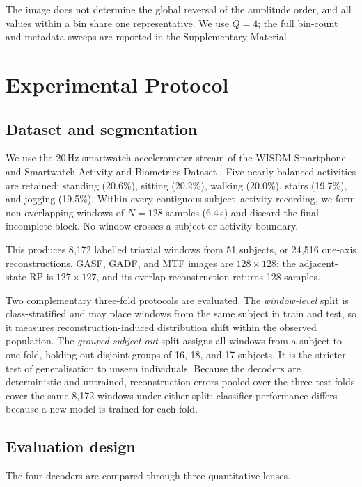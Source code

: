\documentclass[10pt,a4paper,parskip=half-]{scrartcl}
\begin{document}
The image does not determine the global reversal of the amplitude order, and all values within a bin share one representative. We use \(Q=4\); the full bin-count and metadata sweeps are reported in the Supplementary Material.
\section{Experimental Protocol}
\label{sec:experimental_protocol}

\subsection{Dataset and segmentation}

We use the 20\,Hz smartwatch accelerometer stream of the WISDM Smartphone and Smartwatch Activity and Biometrics Dataset \cite{misc_wisdm_smartphone_and_smartwatch_activity_and_biometrics_dataset__507}. Five nearly balanced activities are retained: standing (20.6\%), sitting (20.2\%), walking (20.0\%), stairs (19.7\%), and jogging (19.5\%). Within every contiguous subject--activity recording, we form non-overlapping windows of \(N=128\) samples (6.4\,s) and discard the final incomplete block. No window crosses a subject or activity boundary.

This produces 8,172 labelled triaxial windows from 51 subjects, or 24,516 one-axis reconstructions. GASF, GADF, and MTF images are \(128\times128\); the adjacent-state RP is \(127\times127\), and its overlap reconstruction returns 128 samples.

Two complementary three-fold protocols are evaluated. The \emph{window-level} split is class-stratified and may place windows from the same subject in train and test, so it measures reconstruction-induced distribution shift within the observed population. The \emph{grouped subject-out} split assigns all windows from a subject to one fold, holding out disjoint groups of 16, 18, and 17 subjects. It is the stricter test of generalisation to unseen individuals. Because the decoders are deterministic and untrained, reconstruction errors pooled over the three test folds cover the same 8,172 windows under either split; classifier performance differs because a new model is trained for each fold.

\subsection{Evaluation design}

The four decoders are compared through three quantitative lenses.
\end{document}
